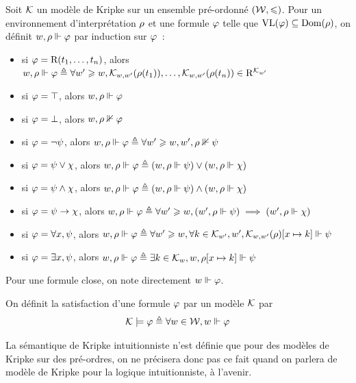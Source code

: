\begin{definition}
  Soit $\mathcal{K}$ un modèle de Kripke sur un ensemble pré-ordonné $(\mathcal{W},\leqslant)$.
  Pour un environnement d'interprétation $\rho$ et une formule $\varphi$ telle
  que $\operatorname{VL}(\varphi)\subseteq\operatorname{Dom}(\rho)$, on définit $w,\rho\Vdash\varphi$ par
  induction sur $\varphi$~:
  \begin{itemize}
  \item si $\varphi = \mathrm{R}(t_1,\ldots,t_n)$, alors
    $w,\rho\Vdash\varphi \triangleq \forall w' \geqslant w,
    \mathcal{K}_{w,w'}(\rho(t_1)),\ldots,\mathcal{K}_{w,w'}(\rho(t_n)) \in
    \mathrm{R}^{\mathcal{K}_{w'}}$
  \item si $\varphi = \top$, alors $w,\rho\Vdash\varphi$
  \item si $\varphi = \bot$, alors $w,\rho\nVdash\varphi$
  \item si $\varphi = \lnot \psi$, alors
    $w,\rho\Vdash\varphi \triangleq \forall w' \geqslant w,w',\rho\nVdash\psi$
  \item si $\varphi = \psi \lor \chi$, alors
    $w,\rho\Vdash\varphi \triangleq (w,\rho\Vdash\psi) \lor (w,\rho\Vdash\chi)$
  \item si $\varphi = \psi \land\chi$, alors
    $w,\rho\Vdash\varphi \triangleq (w,\rho\Vdash\psi) \land(w,\rho\Vdash\chi)$
  \item si $\varphi = \psi \to \chi$, alors
    $w,\rho\Vdash\varphi \triangleq \forall w'\geqslant w,
    (w',\rho\Vdash\psi)\implies (w',\rho\Vdash\chi)$
  \item si $\varphi = \forall x, \psi$, alors
    $w,\rho\Vdash\varphi \triangleq \forall w'\geqslant w,
    \forall k \in \mathcal{K}_{w'},
    w',\mathcal{K}_{w,w'}(\rho)[x\mapsto k]\Vdash \psi$
  \item si $\varphi = \exists x, \psi$, alors
    $w,\rho\Vdash\varphi\triangleq \exists k \in \mathcal{K}_{w},
    w,\rho[x\mapsto k]\Vdash \psi$
  \end{itemize}
  Pour une formule close, on note directement $w\Vdash\varphi$.

  On définit la satisfaction d'une formule $\varphi$ par un modèle $\mathcal{K}$
  par
  \[\mathcal{K} \models \varphi \triangleq \forall w \in \mathcal{W}, w\Vdash \varphi\]
\end{definition}

\begin{remark}
  La sémantique de Kripke intuitionniste n'est définie que pour des modèles de
  Kripke sur des pré-ordres, on ne précisera donc pas ce fait quand on parlera
  de modèle de Kripke pour la logique intuitionniste, à l'avenir.
\end{remark}

